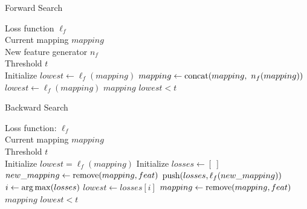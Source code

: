 \documentclass{article}
\begin{document}
\begin{algorithm}[tb]
   \caption{Forward Search}
   \label{alg:forwardsearch}
\begin{algorithmic}
    Loss function $\ell_f$ \\
   \quad \quad \quad Current mapping $mapping$ \\
   \quad \quad \quad New feature generator $n_f$ \\
   \quad \quad \quad Threshold $t$ \\
   \STATE Initialize $lowest \gets \ell_f(mapping)$
   \REPEAT
   \STATE $mapping \gets {\rm concat}(mapping, \ n_f(mapping))$
   \STATE $lowest \gets \ell_f(mapping)$
   \ELSE
    $mapping$
   \ENDIF
   \UNTIL $lowest < t$
\end{algorithmic}
\end{algorithm}

\begin{algorithm}[tb]
   \caption{Backward Search}
   \label{alg:backwardsearch}
\begin{algorithmic}
    Loss function: $\ell_f$ \\
   \quad \quad \quad Current mapping $mapping$ \\
   \quad \quad \quad Threshold $t$ \\
   \STATE Initialize $lowest = \ell_f(mapping)$
   \REPEAT
   \STATE Initialize $losses \gets [ \ ]$
   \STATE $new\_mapping \gets {\rm remove}(mapping, feat)$
   \STATE ${\rm push}(losses, \ell_f(new\_mapping))$
   \ENDFOR
   \STATE $i \gets {\rm arg\,max}(losses)$
   \STATE $lowest \gets losses[i]$
   \STATE $mapping \gets {\rm remove}(mapping, feat)$
   \ELSE
    $mapping$
   \ENDIF
   \UNTIL $lowest < t$
\end{algorithmic}
\end{algorithm}
\end{document}
